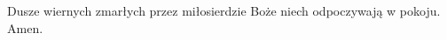 \rubric{\Vbar}Dusze wiernych zmarłych przez miłosierdzie Boże niech odpoczywają w pokoju. \rubric{\Rbar}Amen.